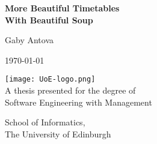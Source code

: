 \documentclass[a4paper,11pt]{report}
\begin{document}
\begin{titlepage}
    \begin{center}
        \vspace*{1cm}
        
        \LARGE{\textbf{More Beautiful Timetables\\With Beautiful Soup}}
        
        \vspace{0.5cm}
        Gaby Antova
        
        \vspace{1.5cm}
        
        \today
        
        \vspace{2.5cm}
        
        \texttt{[image: UoE-logo.png]}\\
        \vfill
        A thesis presented for the degree of\\
        Software Engineering with Management
        
        \vspace{0.8cm}
        

        
        School of Informatics,\\
        The University of Edinburgh\\

        
    \end{center}
\end{titlepage}
\end{document}
